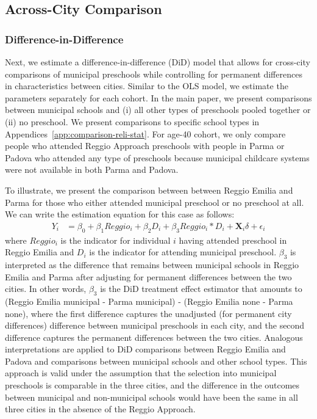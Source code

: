 \subsection{Across-City Comparison} \label{sec:across-city-analysis}
\subsubsection{Difference-in-Difference}  \label{subsubsection:DID}
Next, we estimate a difference-in-difference (DiD) model that allows for cross-city comparisons of municipal preschools while controlling for permanent differences in characteristics between cities. Similar to the OLS model, we estimate the parameters separately for each cohort. In the main paper, we present comparisons between municipal schools and (i) all other types of preschools pooled together or (ii) no preschool. We present comparisons to specific school types in Appendices~\ref{app:comparison-reli-stat}. %
For age-40 cohort, we only compare people who attended Reggio Approach preschools with people in Parma or Padova who attended any type of preschools because municipal childcare systems were not available in both Parma and Padova. 

To illustrate, we present the comparison between between Reggio Emilia and Parma for those who either attended municipal preschool or no preschool at all. We can write the estimation equation for this case as follows:
\begin{eqnarray}  \label{eq:specific2}
Y_i & = \beta_0 + \beta_1 Reggio_i + \beta_2 D_i + \beta_3 Reggio_i * D_i + \bm{X}_i\delta + \epsilon_i
\end{eqnarray}
\noindent where $Reggio_i$ is the indicator for individual $i$ having attended preschool in Reggio Emilia and $D_i$ is the indicator for attending municipal preschool. $\beta_3$ is interpreted as the difference that remains between municipal schools in Reggio Emilia and Parma after adjusting for permanent differences between the two cities. In other words, $\beta_3$ is the DiD treatment effect estimator that amounts to (Reggio Emilia municipal - Parma municipal) - (Reggio Emilia none - Parma none), where the first difference captures the unadjusted (for permanent city differences) difference between municipal preschools in each city, and the second difference captures the permanent differences between the two cities. Analogous interpretations are applied to DiD comparisons between Reggio Emilia and Padova and comparisons between municipal schools and other school types. This approach is valid under the assumption that the selection into municipal preschools is comparable in the three cities, and the difference in the outcomes between municipal and non-municipal schools would have been the same in all three cities in the absence of the Reggio Approach.

